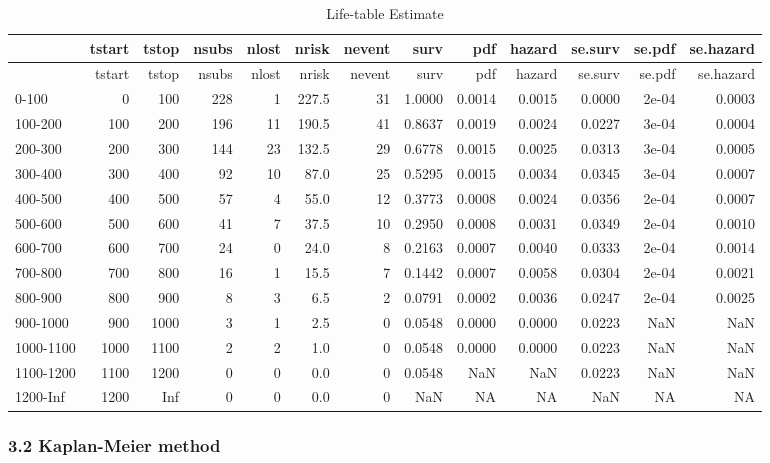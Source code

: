 \documentclass[
]{article}
\begin{document}
\begin{longtable}[]{@{}lrrrrrrrrrrrr@{}}
\caption{Life-table Estimate}\tabularnewline
\toprule
& tstart & tstop & nsubs & nlost & nrisk & nevent & surv & pdf & hazard
& se.surv & se.pdf & se.hazard \\
\midrule
\endfirsthead
\toprule
& tstart & tstop & nsubs & nlost & nrisk & nevent & surv & pdf & hazard
& se.surv & se.pdf & se.hazard \\
\midrule
\endhead
0-100 & 0 & 100 & 228 & 1 & 227.5 & 31 & 1.0000 & 0.0014 & 0.0015 &
0.0000 & 2e-04 & 0.0003 \\
100-200 & 100 & 200 & 196 & 11 & 190.5 & 41 & 0.8637 & 0.0019 & 0.0024 &
0.0227 & 3e-04 & 0.0004 \\
200-300 & 200 & 300 & 144 & 23 & 132.5 & 29 & 0.6778 & 0.0015 & 0.0025 &
0.0313 & 3e-04 & 0.0005 \\
300-400 & 300 & 400 & 92 & 10 & 87.0 & 25 & 0.5295 & 0.0015 & 0.0034 &
0.0345 & 3e-04 & 0.0007 \\
400-500 & 400 & 500 & 57 & 4 & 55.0 & 12 & 0.3773 & 0.0008 & 0.0024 &
0.0356 & 2e-04 & 0.0007 \\
500-600 & 500 & 600 & 41 & 7 & 37.5 & 10 & 0.2950 & 0.0008 & 0.0031 &
0.0349 & 2e-04 & 0.0010 \\
600-700 & 600 & 700 & 24 & 0 & 24.0 & 8 & 0.2163 & 0.0007 & 0.0040 &
0.0333 & 2e-04 & 0.0014 \\
700-800 & 700 & 800 & 16 & 1 & 15.5 & 7 & 0.1442 & 0.0007 & 0.0058 &
0.0304 & 2e-04 & 0.0021 \\
800-900 & 800 & 900 & 8 & 3 & 6.5 & 2 & 0.0791 & 0.0002 & 0.0036 &
0.0247 & 2e-04 & 0.0025 \\
900-1000 & 900 & 1000 & 3 & 1 & 2.5 & 0 & 0.0548 & 0.0000 & 0.0000 &
0.0223 & NaN & NaN \\
1000-1100 & 1000 & 1100 & 2 & 2 & 1.0 & 0 & 0.0548 & 0.0000 & 0.0000 &
0.0223 & NaN & NaN \\
1100-1200 & 1100 & 1200 & 0 & 0 & 0.0 & 0 & 0.0548 & NaN & NaN & 0.0223
& NaN & NaN \\
1200-Inf & 1200 & Inf & 0 & 0 & 0.0 & 0 & NaN & NA & NA & NaN & NA &
NA \\
\bottomrule
\end{longtable}

\hypertarget{kaplan-meier-method}{%
\subsubsection{3.2 Kaplan-Meier method}\label{kaplan-meier-method}}
\end{document}
